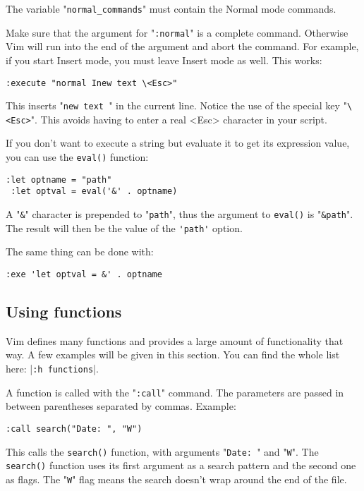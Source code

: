 The variable "\verb!normal_commands!" must contain the Normal mode commands.

Make sure that the argument for "\verb!:normal!" is a complete command.
Otherwise Vim will run into the end of the argument and abort the command.
For example, if you start Insert mode, you must leave Insert mode as well.
This works:

\begin{Verbatim}[samepage=true]
 :execute "normal Inew text \<Esc>"
\end{Verbatim}

This inserts "\verb!new text !" in the current line.
Notice the use of the special key "\verb!\<Esc>!".
This avoids having to enter a real <Esc> character in your script.

If you don't want to execute a string but evaluate it to get its expression value, you can use the \verb!eval()! function:

\begin{Verbatim}[samepage=true]
 :let optname = "path"
 :let optval = eval('&' . optname)
\end{Verbatim}

A "\verb!&!" character is prepended to "\verb!path!", thus the argument to \verb!eval()! is "\verb!&path!".
The result will then be the value of the \verb!'path'! option.

The same thing can be done with:

\begin{Verbatim}[samepage=true]
 :exe 'let optval = &' . optname
\end{Verbatim}

\subsection{Using functions}
Vim defines many functions and provides a large amount of functionality that way.
A few examples will be given in this section.
You can find the whole list here: |\verb!:h functions!|.

A function is called with the "\verb!:call!" command.
The parameters are passed in between parentheses separated by commas.
Example:

\begin{Verbatim}[samepage=true]
 :call search("Date: ", "W")
\end{Verbatim}

This calls the \verb!search()! function, with arguments "\verb!Date: !" and "\verb!W!".
The \verb!search()! function uses its first argument as a search pattern and the second one as flags.
The "\verb!W!" flag means the search doesn't wrap around the end of the file.

